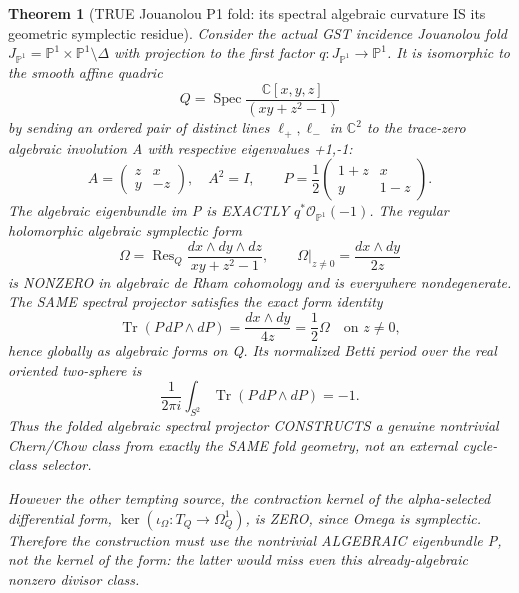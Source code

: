 \documentclass[11pt]{article}
\newtheorem{theorem}{Theorem}[section]
\begin{document}
\begin{theorem}[TRUE Jouanolou P1 fold: its spectral algebraic curvature IS its geometric symplectic residue]
Consider the actual GST
incidence Jouanolou fold
$J_{\mathbb P^1}
=\mathbb P^1\times\mathbb P^1
 \setminus\Delta$
with projection to the first
factor $q:J_{\mathbb P^1}\to\mathbb P^1$.
It is isomorphic to the
smooth affine quadric
\[
 \boxed{
 Q=\operatorname{Spec}
 \frac{\mathbb C[x,y,z]}
      {(xy+z^2-1)}
 }                                                     \tag{21}
\]
by sending an ordered pair
of distinct lines $\ell_+,\ell_-$
in $\mathbb C^2$ to the
trace-zero algebraic involution
A with respective eigenvalues
+1,-1:
\[
 \boxed{
 A=\begin{pmatrix}z&x\\y&-z\end{pmatrix},
 \quad A^2=I,\qquad
 P=\frac12
   \begin{pmatrix}1+z&x\\y&1-z\end{pmatrix}.
 }                                                     \tag{22}
\]
The algebraic eigenbundle im P is
EXACTLY $q^*\mathcal O_{\mathbb P^1}(-1)$.
The regular holomorphic algebraic
symplectic form
\[
 \boxed{
 \Omega=\operatorname{Res}_{Q}
  \frac{dx\wedge dy\wedge dz}
       {xy+z^2-1},
 \qquad
 \Omega|_{z\ne0}
     =\frac{dx\wedge dy}{2z}
 }                                                     \tag{23}
\]
is NONZERO in algebraic de Rham
cohomology and is everywhere
nondegenerate. The SAME spectral
projector satisfies the exact
form identity
\[
 \boxed{
 \operatorname{Tr}(P\,dP\wedge dP)
        =\frac{dx\wedge dy}{4z}
        =\frac12\Omega
       \quad\text{on }z\ne0,
 }                                                     \tag{24}
\]
hence globally as algebraic
forms on Q.
Its normalized Betti period
over the real oriented
two-sphere is
\[
 \boxed{
 \frac1{2\pi i}
       \int_{S^2}\operatorname{Tr}
               (P\,dP\wedge dP)=-1.
 }                                                     \tag{25}
\]
Thus the folded algebraic
spectral projector CONSTRUCTS a
genuine nontrivial Chern/Chow
class from exactly the SAME
fold geometry, not an external
cycle-class selector.

However the other tempting
source, the contraction kernel
of the alpha-selected
differential form,
$\ker(\iota_{\Omega}:T_Q\to\Omega_Q^1)$,
is ZERO, since Omega is
symplectic. Therefore the
construction must use the
nontrivial ALGEBRAIC
eigenbundle P, not the
kernel of the form:
the latter would miss even
this already-algebraic
nonzero divisor class.
\end{theorem}
\end{document}
